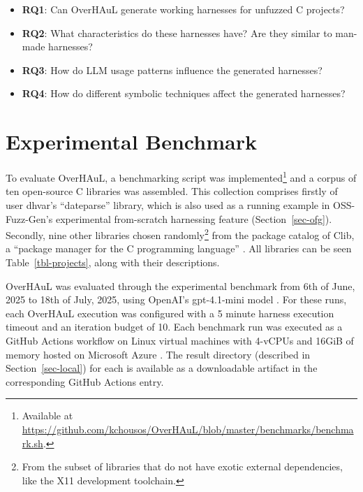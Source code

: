 \documentclass[
  a4paper,
]{scrreprt}
\theoremstyle{definition}
\theoremstyle{remark}
\begin{document}
\begin{itemize}
\item
  \textbf{RQ1}: Can OverHAuL generate working harnesses for unfuzzed C
  projects?
\item
  \textbf{RQ2}: What characteristics do these harnesses have? Are they
  similar to man-made harnesses?
\item
  \textbf{RQ3}: How do LLM usage patterns influence the generated
  harnesses?
\item
  \textbf{RQ4}: How do different symbolic techniques affect the
  generated harnesses?
\end{itemize}

\section{Experimental Benchmark}\label{sec-benchmark}

To evaluate OverHAuL, a benchmarking script was implemented\footnote{Available
  at
  \url{https://github.com/kchousos/OverHAuL/blob/master/benchmarks/benchmark.sh}.}
and a corpus of ten open-source C libraries was assembled. This
collection comprises firstly of user dhvar's ``dateparse'' library,
which is also used as a running example in OSS-Fuzz-Gen's
\autocite{oss-fuzz-gen} experimental from-scratch harnessing feature
(Section~\ref{sec-ofg}). Secondly, nine other libraries chosen
randomly\footnote{From the subset of libraries that do not have exotic
  external dependencies, like the X11 development toolchain.} from the
package catalog of Clib, a ``package manager for the C programming
language'' \autocite{clibs,clib}. All libraries can be seen
Table~\ref{tbl-projects}, along with their descriptions.

OverHAuL was evaluated through the experimental benchmark from 6th of
June, 2025 to 18th of July, 2025, using OpenAI's gpt-4.1-mini model
\autocite{openaidocs2025}. For these runs, each OverHAuL execution was
configured with a 5 minute harness execution timeout and an iteration
budget of 10. Each benchmark run was executed as a GitHub Actions
workflow on Linux virtual machines with 4-vCPUs and 16GiB of memory
hosted on Microsoft Azure \autocite{githubdocs2025a,githubdocs2025}. The
result directory (described in Section~\ref{sec-local}) for each is
available as a downloadable artifact in the corresponding GitHub Actions
entry.
\end{document}
